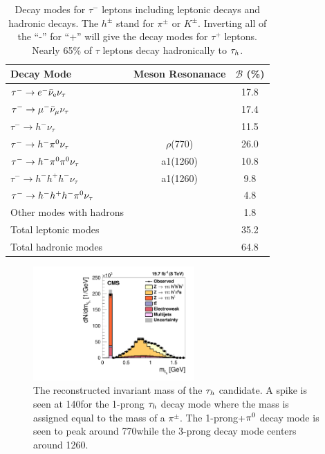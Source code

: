 \begin{table}[htbp]
\centering
\begin{tabular}{|l|cc|}
\hline
Decay Mode                                             &   Meson Resonanace     & $\mathcal{B}$ (\%) \\
\hline
$\tau^{-}  \to  e^{-}\bar{\nu}_{\text{e}}\nu_{\tau}$ &                        &     17.8  \\
$\tau^{-}  \to  \mu^{-}\bar{\nu}_{\mu}\nu_{\tau}$     &                        &     17.4  \\
$\tau^{-}  \to  h^{-}\nu_{\tau}$                       &                        &     11.5  \\
$\tau^{-}  \to  h^{-}\pi^{0}\nu_{\tau}$                  &      $\rho$(770)       &     26.0  \\
$\tau^{-}  \to  h^{-}\pi^{0}\pi^{0}\nu_{\tau}$             &      a1(1260)          &     10.8  \\
$\tau^{-}  \to  h^{-}h^{+}h^{-}\nu_{\tau}$             &      a1(1260)          &      9.8  \\
$\tau^{-}  \to  h^{-}h^{+}h^{-}\pi^{0}\nu_{\tau}$        &                        &      4.8  \\
Other modes with hadrons                               &                        &      1.8  \\
\hline
Total leptonic modes                                   &                        &     35.2  \\
Total hadronic modes                                   &                        &     64.8  \\
\hline
\end{tabular}
\caption{
Decay modes for $\tau^{-}$ leptons including leptonic decays and hadronic decays. 
The $h^{\pm}$ stand for $\pi^{\pm}$ or $K^{\pm}$. Inverting all
of the ``-'' for ``+'' will give the decay modes for $\tau^{+}$ leptons. Nearly 65\% of $\tau$
leptons decay hadronically to $\tau_{h}$.
}
\label{tab:tau_dms}
\end{table}

\begin{figure}[htbp]
\centering
     \includegraphics[width=0.55\textwidth]{object_reconstruction_and_selection/plots/CMS-TAU-14-001_tau_mass.pdf}
     \caption{
The reconstructed invariant mass of the $\tau_{h}$ candidate. A spike is seen at 140\MeV for the 1-prong
$\tau_{h}$ decay mode where the mass is assigned equal to the mass of a $\pi^{\pm}$. The 1-prong+$\pi^{0}$
decay mode is seen to peak around 770\MeV while the 3-prong decay mode centers around 1260\MeV.
     }
     \label{fig:tau_mass}
\end{figure}

